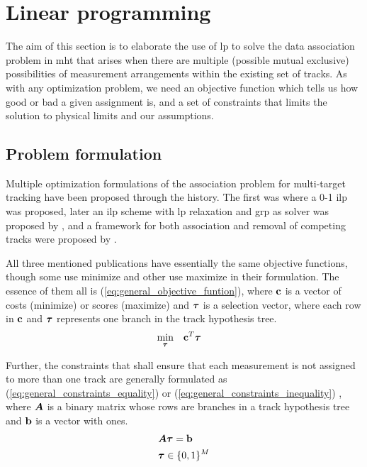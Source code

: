 \section{Linear programming}
\label{sec:ilp}
The aim of this section is to elaborate the use of \gls{lp} to solve the data association problem in \gls{mht} that arises when there are multiple (possible mutual exclusive) possibilities of measurement arrangements within the existing set of tracks. As with any optimization problem, we need an objective function which tells us how good or bad a given assignment is, and a set of constraints that limits the solution to physical limits and our assumptions.

\subsection{Problem formulation}
Multiple optimization formulations of the association problem for multi-target tracking have been proposed through the history. The first was \cite{Morefield1977} where a 0-1 \gls{ilp} was proposed, later an \gls{ilp} scheme with \gls{lp} relaxation and \gls{grp} as solver was proposed by \cite{Storms2003}, and a framework for both association and removal of competing tracks were proposed by \cite{Coraluppi2004}.

All three mentioned publications have essentially the same objective functions, though some use minimize and other use maximize in their formulation. The essence of them all is (\ref{eq:general_objective_funtion}), where $\boldsymbol{\mathbf{c}}$ is a vector of costs (minimize) or scores (maximize) and $\boldsymbol{\mathbf{\tau}}$ is a selection vector, where each row in $\boldsymbol{\mathbf{c}}$ and $\boldsymbol{\mathbf{\tau}}$ represents one branch in the track hypothesis tree.
\begin{equation}
\begin{aligned}
& \underset{\boldsymbol{\mathbf{\tau}}}{\text{min}}
& & \boldsymbol{\mathbf{c}}^T \boldsymbol{\mathbf{\tau}}
\end{aligned}
\label{eq:general_objective_funtion}
\end{equation}

Further, the constraints that shall ensure that each measurement is not assigned to more  than one track are generally formulated as (\ref{eq:general_constraints_equality}) or (\ref{eq:general_constraints_inequality}) , where $\bm{A}$ is a binary matrix whose rows are branches in a track hypothesis tree and $\boldsymbol{\mathbf{b}}$ is a vector with ones.
\begin{equation}
\begin{aligned}
&	\bm{A} \boldsymbol{\mathbf{\tau}} = \boldsymbol{\mathbf{b}} 	\\
&	\boldsymbol{\mathbf{\tau}} \in \{0,1\}^M
\end{aligned}
\label{eq:general_constraints_equality}
\end{equation}

